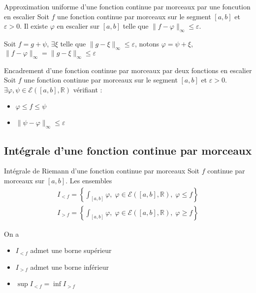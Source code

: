 \begin{Corollary}{Approximation uniforme d'une fonction continue par morceaux par une foncution en escalier}{}
  Soit $f$ une fonction continue par morceaux sur le segment $[a,b]$ et $\varepsilon>0$. Il existe $\varphi$ en escalier sur $[a,b]$ telle que $\| f-\varphi \| _{\infty} \le \varepsilon$.
\end{Corollary}
\begin{myproof}{}{}
Soit $f  = g + \psi$, $\exists \xi$ telle que $\| g - \xi \| _{\infty} \le \varepsilon$, notons $\varphi = \psi + \xi$, $\| f - \varphi \| _{\infty} = \| g - \xi \| _{\infty} \le \varepsilon$
\end{myproof}

\begin{Corollary}{Encadrement d'une fonction continue par morceaux par deux fonctions en escalier}{}
  Soit $f$ une fonction continue par morceaux sur le segment $[a,b]$ et $\varepsilon>0$. $\exists \varphi, \psi \in \mathcal{E}([a,b], \mathbb{R})$ vérifiant :
  \begin{itemize}

      \item $\varphi \le f \le \psi$ 
      \item $\| \psi - \varphi \| _{ \infty} \le \varepsilon$

  \end{itemize}
\end{Corollary}





\subsection{Intégrale d'une fonction continue par morceaux} %
\label{sub:Intégrale d'une fonction continue par morceaux}

\begin{Prop}{Intégrale de Riemann d'une fonction continue par morceaux}{}
  Soit $f$ continue par morceaux sur $[a,b]$. Les ensembles 
\begin{gather}
  I _{<f} = \left\{ \int _{[a,b]} \varphi,\; \varphi \in \mathcal{E}([a,b],\mathbb{R}), \; \varphi \le f\right\} \\
  I _{>f} = \left\{ \int _{[a,b]} \varphi,\; \varphi \in \mathcal{E}([a,b],\mathbb{R}), \; \varphi \ge f\right\}
\end{gather}

On a 
\begin{itemize}

    \item $I _{<f}$ admet une borne supérieur
    \item $I _{>f}$ admet une borne inférieur
    \item $\sup I _{<f} = \inf I _{>f}$
    

\end{itemize}


\end{Prop}

